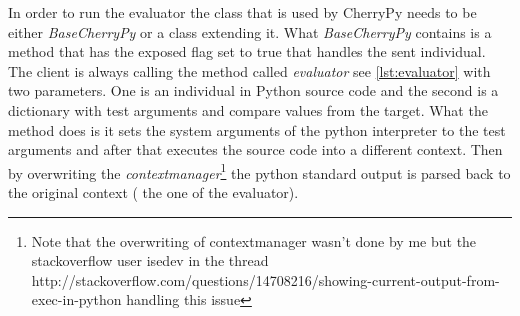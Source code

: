 In order to run the evaluator the class that is used by CherryPy needs to be either \textit{BaseCherryPy} or a class extending it. What \textit{BaseCherryPy} contains
is a method that has the exposed flag set to true that handles the sent individual. The client is always calling the method called \textit{evaluator} see \ref{lst:evaluator} with two parameters.
One is an individual in Python source code and the second is a dictionary with test arguments and compare values from the target. What the method does is it sets the system arguments
of the python interpreter to the test arguments and after that executes the source code into a different context. Then by overwriting the \textit{contextmanager}\footnote{Note that the overwriting of contextmanager
wasn't done by me but the stackoverflow user isedev in the thread http://stackoverflow.com/questions/14708216/showing-current-output-from-exec-in-python handling this issue} the python standard output is
parsed back to the original context ( the one of the evaluator).